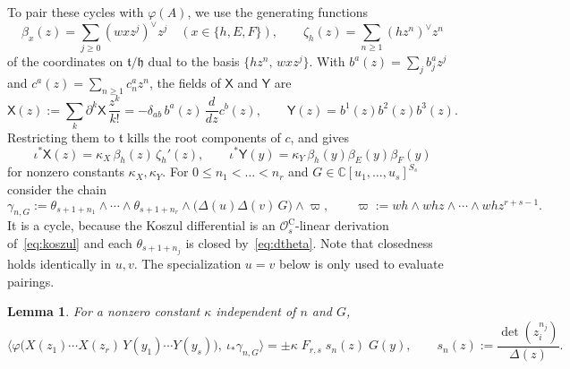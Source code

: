 \documentclass[11pt]{amsart}
\numberwithin{equation}{section}
\newtheorem{lemma}[theorem]{Lemma}
\theoremstyle{definition}
\theoremstyle{remark}
\newcommand{\C}{\mathbb{C}}
\newcommand{\hh}{\mathfrak{h}}
\newcommand{\tl}{\mathfrak{t}}
\newcommand{\dd}{\partial}
\newcommand{\cO}{\mathcal{O}}
\newcommand{\Xc}{\mathsf{X}}
\newcommand{\Yc}{\mathsf{Y}}
\newcommand{\Car}{\mathrm{C}}
\begin{document}
To pair these cycles with $\varphi(A)$, we use the generating functions
\begin{equation}\label{eq:beta-zeta}
\beta_x(z)=\sum_{j\ge0}(wxz^j)^\vee z^j\quad(x\in\{h,E,F\}),\qquad \zeta_h(z)=\sum_{n\ge1}(hz^n)^\vee z^n
\end{equation}
of the coordinates on $\tl/\hh$ dual to the basis $\{hz^n,\,wxz^j\}$. With $b^a(z)=\sum_jb_j^az^j$ and $c^a(z)=\sum_{n\ge1}c_n^az^n$, the fields of $\Xc$ and $\Yc$ are
\begin{equation}\label{eq:XY-cochain-fields}
\Xc(z):=\sum_k\dd^k\Xc\,\frac{z^k}{k!}=-\delta_{ab}\,b^a(z)\,\frac{d}{dz}c^b(z),\qquad \Yc(z)=b^1(z)b^2(z)b^3(z).
\end{equation}
Restricting them to $\tl$ kills the root components of $c$, and gives
\begin{equation}\label{eq:restrictedfields}
\iota^*\Xc(z)=\kappa_X\,\beta_h(z)\,\zeta_h'(z),\qquad \iota^*\Yc(y)=\kappa_Y\,\beta_h(y)\beta_E(y)\beta_F(y)
\end{equation}
for nonzero constants $\kappa_X,\kappa_Y$. For $0\le n_1<\dots<n_r$ and $G\in\C[u_1,\dots,u_s]^{S_s}$ consider the chain
\begin{equation}\label{eq:gamma-nG}
\gamma_{n,G}:=\theta_{s+1+n_1}\wedge\cdots\wedge\theta_{s+1+n_r}\wedge\bigl(\Delta(u)\Delta(v)\,G\bigr)\wedge\varpi,\qquad
\varpi:=wh\wedge whz\wedge\cdots\wedge whz^{r+s-1}.
\end{equation}
It is a cycle, because the Koszul differential is an $\cO^\Car_s$-linear derivation of~\eqref{eq:koszul} and each $\theta_{s+1+n_j}$ is closed by~\eqref{eq:dtheta}. Note that closedness holds identically in $u,v$. The specialization $u=v$ below is only used to evaluate pairings.

\begin{lemma}\label{lem:pairing}
For a nonzero constant $\kappa$ independent of $n$ and $G$,
\begin{equation}\label{eq:pairing}
\bigl\langle\varphi\bigl(X(z_1)\cdots X(z_r)\,Y(y_1)\cdots Y(y_s)\bigr),\ \iota_*\gamma_{n,G}\bigr\rangle
=\pm\kappa\;F_{r,s}\;s_n(z)\;G(y),
\qquad s_n(z):=\frac{\det(z_i^{n_j})}{\Delta(z)} .
\end{equation}
\end{lemma}
\end{document}
